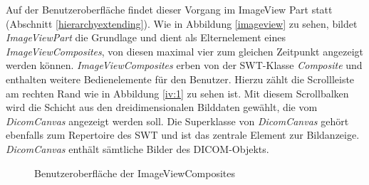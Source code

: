 Auf der Benutzeroberfläche findet dieser Vorgang im ImageView Part statt (Abschnitt \ref{hierarchyextending}). Wie in Abbildung \ref{imageview} zu sehen, bildet \textit{ImageViewPart} die Grundlage und dient als Elternelement eines \textit{ImageViewComposites}, von diesen maximal vier zum gleichen Zeitpunkt angezeigt werden können. \textit{ImageViewComposites} erben von der SWT-Klasse \textit{Composite} und enthalten weitere Bedienelemente für den Benutzer. Hierzu zählt die Scrollleiste am rechten Rand wie in Abbildung \ref{iv:1} zu sehen ist. Mit diesem Scrollbalken wird die Schicht aus den dreidimensionalen Bilddaten gewählt, die vom \textit{DicomCanvas} angezeigt werden soll. Die Superklasse von \textit{DicomCanvas} gehört ebenfalls zum Repertoire des SWT und ist das zentrale Element zur Bildanzeige. \textit{DicomCanvas} enthält sämtliche Bilder des DICOM-Objekts.

\begin{figure}[htb]
\centering
{}
\caption{Benutzeroberfläche der ImageViewComposites}
\label{ivcomposite}
\end{figure}


